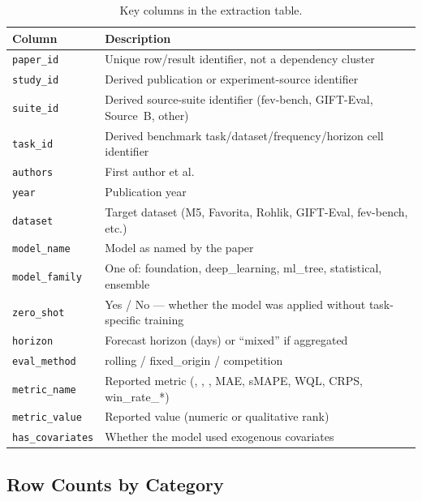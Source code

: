 \begin{table}[htbp]
\centering
\caption{Key columns in the extraction table.}\label{tab:extraction-columns}
\footnotesize
\begin{tabular}{lp{8.5cm}}
\toprule
Column & Description \\
\midrule
\texttt{paper\_id}       & Unique row/result identifier, not a dependency cluster \\
\texttt{study\_id}       & Derived publication or experiment-source identifier \\
\texttt{suite\_id}       & Derived source-suite identifier (fev-bench, GIFT-Eval, Source~B, other) \\
\texttt{task\_id}        & Derived benchmark task/dataset/frequency/horizon cell identifier \\
\texttt{authors}         & First author et al. \\
\texttt{year}            & Publication year \\
\texttt{dataset}         & Target dataset (M5, Favorita, Rohlik, GIFT-Eval, fev-bench, etc.) \\
\texttt{model\_name}     & Model as named by the paper \\
\texttt{model\_family}   & One of: foundation, deep\_learning, ml\_tree, statistical, ensemble \\
\texttt{zero\_shot}      & Yes / No --- whether the model was applied without task-specific training \\
\texttt{horizon}         & Forecast horizon (days) or ``mixed'' if aggregated \\
\texttt{eval\_method}    & rolling / fixed\_origin / competition \\
\texttt{metric\_name}    & Reported metric (\WAPE{}, \WRMSSE{}, \MASE{}, MAE, sMAPE, WQL, CRPS, win\_rate\_*) \\
\texttt{metric\_value}   & Reported value (numeric or qualitative rank) \\
\texttt{has\_covariates} & Whether the model used exogenous covariates \\
\bottomrule
\end{tabular}
\end{table}

\subsection{Row Counts by Category}

